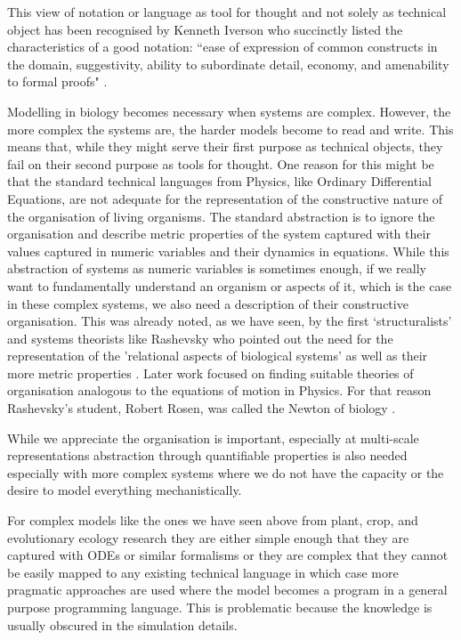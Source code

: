 This view of notation or language as tool for thought and not solely as
technical object has been recognised by Kenneth Iverson who succinctly listed the
characteristics of a good notation: ``ease of expression of common constructs
in the domain, suggestivity, ability to subordinate detail, economy, and
amenability to formal proofs" \citep{iverson2007notation}.

Modelling in biology becomes necessary when systems are complex. However, the
more complex the systems are, the harder models become to read and write. This
means that, while they might serve their first purpose as technical objects,
they fail on their second purpose as tools for thought. One reason for this
might be that the standard technical languages from Physics, like Ordinary
Differential Equations, are not adequate for the representation of the
constructive nature of the organisation of living organisms. The standard
abstraction is to ignore the organisation and describe metric properties of the
system captured with their values captured in numeric variables and their
dynamics in equations. While this abstraction of systems as numeric variables is
sometimes enough, if we really want to fundamentally understand an organism or
aspects of it, which is the case in these complex systems, we also need a
description of their constructive organisation. This was already noted, as we
have seen, by the first `structuralists' and systems theorists like Rashevsky
who pointed out the need for the representation of the 'relational aspects of
biological systems' as well as their more metric properties
\citet{rashevsky_topology_1954}. Later work focused on finding suitable theories
of organisation analogous to the equations of motion in Physics. For that
reason Rashevsky's student, Robert Rosen, was called the Newton of biology
\citep{mikulecky2001robert}.

While we appreciate the organisation is important, especially at multi-scale
representations abstraction through quantifiable properties is also needed
especially with more complex systems where we do not have the capacity or the
desire to model everything mechanistically.

For complex models like the ones we have seen above from plant, crop, and
evolutionary ecology research they are either simple enough that they are
captured with ODEs or similar formalisms or they are complex that they cannot be
easily mapped to any existing technical language in which case more pragmatic
approaches are used where the model becomes a program in a general purpose
programming language. This is problematic because the knowledge is usually
obscured in the simulation details.

